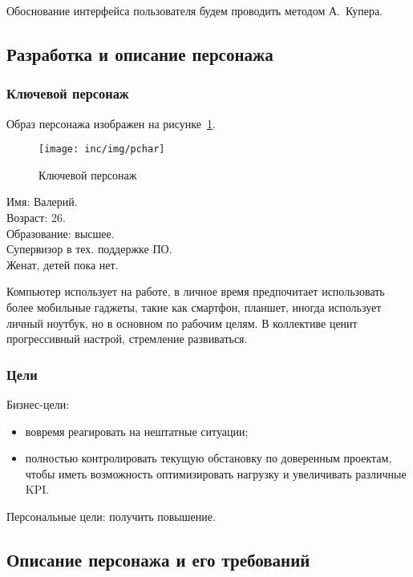 Обоснование интерфейса пользователя будем проводить методом А.~Купера. %

\subsection{Разработка и описание персонажа}

\subsubsection{Ключевой персонаж}

Образ персонажа изображен на рисунке~\ref{pic:pcharacter}.

\begin{figure}
    \centering
    \texttt{[image: inc/img/pchar]}
    \caption{Ключевой персонаж}
    \label{pic:pcharacter}
\end{figure}

\noindent Имя: Валерий. \\
Возраст: 26. \\
Образование: высшее. \\
Супервизор в тех. поддержке ПО. \\
Женат, детей пока нет.

Компьютер использует на работе,
в личное время предпочитает использовать более мобильные гаджеты,
такие как смартфон, планшет, иногда использует личный ноутбук,
но в основном по рабочим целям.
В коллективе ценит прогрессивный настрой, стремление развиваться.

\subsubsection{Цели}

Бизнес-цели:
\begin{itemize}
    \item вовремя реагировать на нештатные ситуации;
    \item полностью контролировать текущую обстановку по доверенным проектам, чтобы иметь возможность оптимизировать нагрузку и увеличивать различные KPI\@.
\end{itemize}

Персональные цели: получить повышение.

\subsection{Описание персонажа и его требований}

